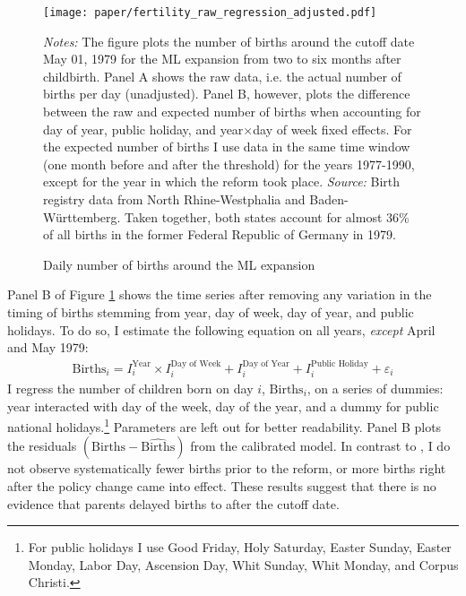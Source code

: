 \begin{figure}[H]\centering
	\caption{Daily number of births around the ML expansion}\label{fig_mlch: fertilitydistr}
	\texttt{[image: paper/fertility\_raw\_regression\_adjusted.pdf]}
	\scriptsize
	\begin{minipage}{0.9 \linewidth}
		\emph{Notes:} The figure plots the number of births around the cutoff date May 01, 1979 for the ML expansion from two to six months after childbirth. Panel A shows the raw data, i.e. the actual number of births per day (unadjusted). Panel B, however, plots the difference between the raw and expected number of births when accounting for day of year, public holiday, and year$\times$day of week fixed effects. For the expected number of births I use data in the same time window (one month before and after the threshold) for the years 1977-1990, except for the year in which the reform took place. \newline\emph{Source:} Birth registry data from North Rhine-Westphalia and Baden-Württemberg. Taken together, both states account for almost 36\% of all births in the former Federal Republic of Germany in 1979.
	\end{minipage}
\end{figure}

Panel B of Figure \ref{fig_mlch: fertilitydistr} shows the time series after removing any variation in the timing of births stemming from year, day of week, day of year, and public holidays. To do so, I estimate the following equation on all years, \emph{except} April and May 1979:
\begin{align}
\text{Births}_i = I^{\text{Year}}_i\times I^{\text{Day of Week}}_i + I^{\text{Day of Year}}_i + I^{\text{Public Holiday}}_i + \varepsilon_i \label{eq: validity_fig}
\end{align}
I regress the number of children born on day $i$, $\text{Births}_i$, on a series of dummies: year interacted with day of the week, day of the year, and a dummy for public national holidays.\footnote{For public holidays I use Good Friday, Holy Saturday, Easter Sunday, Easter Monday, Labor Day, Ascension Day, Whit Sunday, Whit Monday, and Corpus Christi.} Parameters are left out for better readability. Panel B plots the residuals $(\text{Births}-\widehat{\text{Births}})$ from the calibrated model. In contrast to \cite{gans2009born}, I do not observe systematically fewer births prior to the reform, or more births right after the policy change came into effect. These results suggest that there is no evidence that parents delayed births to after the cutoff date.


